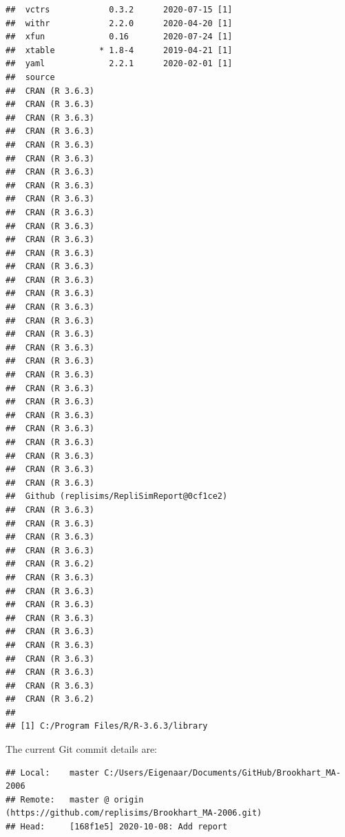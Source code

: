 \documentclass[10,a4paperpaper,]{article}
\begin{document}
\begin{verbatim}
##  vctrs            0.3.2      2020-07-15 [1]
##  withr            2.2.0      2020-04-20 [1]
##  xfun             0.16       2020-07-24 [1]
##  xtable         * 1.8-4      2019-04-21 [1]
##  yaml             2.2.1      2020-02-01 [1]
##  source                                   
##  CRAN (R 3.6.3)                           
##  CRAN (R 3.6.3)                           
##  CRAN (R 3.6.3)                           
##  CRAN (R 3.6.3)                           
##  CRAN (R 3.6.3)                           
##  CRAN (R 3.6.3)                           
##  CRAN (R 3.6.3)                           
##  CRAN (R 3.6.3)                           
##  CRAN (R 3.6.3)                           
##  CRAN (R 3.6.3)                           
##  CRAN (R 3.6.3)                           
##  CRAN (R 3.6.3)                           
##  CRAN (R 3.6.3)                           
##  CRAN (R 3.6.3)                           
##  CRAN (R 3.6.3)                           
##  CRAN (R 3.6.3)                           
##  CRAN (R 3.6.3)                           
##  CRAN (R 3.6.3)                           
##  CRAN (R 3.6.3)                           
##  CRAN (R 3.6.3)                           
##  CRAN (R 3.6.3)                           
##  CRAN (R 3.6.3)                           
##  CRAN (R 3.6.3)                           
##  CRAN (R 3.6.3)                           
##  CRAN (R 3.6.3)                           
##  CRAN (R 3.6.3)                           
##  CRAN (R 3.6.3)                           
##  CRAN (R 3.6.3)                           
##  CRAN (R 3.6.3)                           
##  CRAN (R 3.6.3)                           
##  Github (replisims/RepliSimReport@0cf1ce2)
##  CRAN (R 3.6.3)                           
##  CRAN (R 3.6.3)                           
##  CRAN (R 3.6.3)                           
##  CRAN (R 3.6.3)                           
##  CRAN (R 3.6.2)                           
##  CRAN (R 3.6.3)                           
##  CRAN (R 3.6.3)                           
##  CRAN (R 3.6.3)                           
##  CRAN (R 3.6.3)                           
##  CRAN (R 3.6.3)                           
##  CRAN (R 3.6.3)                           
##  CRAN (R 3.6.3)                           
##  CRAN (R 3.6.3)                           
##  CRAN (R 3.6.3)                           
##  CRAN (R 3.6.2)                           
## 
## [1] C:/Program Files/R/R-3.6.3/library
\end{verbatim}

The current Git commit details are:

\begin{verbatim}
## Local:    master C:/Users/Eigenaar/Documents/GitHub/Brookhart_MA-2006
## Remote:   master @ origin (https://github.com/replisims/Brookhart_MA-2006.git)
## Head:     [168f1e5] 2020-10-08: Add report
\end{verbatim}
\end{document}
